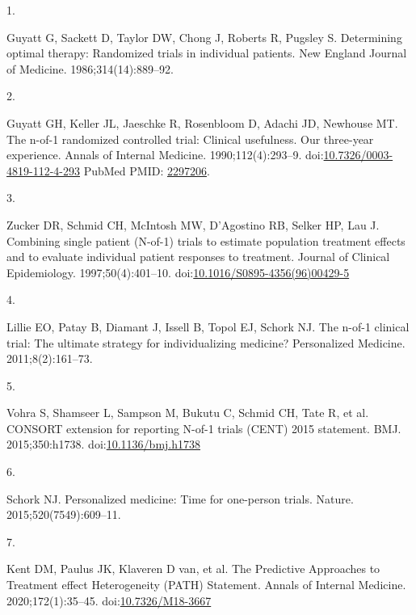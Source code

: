 \documentclass[
  11pt,
]{article}
\newlength{\cslhangindent}
\newlength{\csllabelwidth}
\newenvironment{CSLReferences}[2] %
 {\begin{list}{}{%
  \setlength{\itemindent}{0pt}
  \setlength{\leftmargin}{0pt}
  \setlength{\parsep}{0pt}
  \ifodd #1
   \setlength{\leftmargin}{\cslhangindent}
   \setlength{\itemindent}{-1\cslhangindent}
  \fi
  \setlength{\itemsep}{#2\baselineskip}}}
 {\end{list}}
\newcommand{\CSLLeftMargin}[1]{\parbox[t]{\csllabelwidth}{\strut#1\strut}}
\newcommand{\CSLRightInline}[1]{\parbox[t]{\linewidth - \csllabelwidth}{\strut#1\strut}}
\begin{document}
\protect{}\label{refs}
\begin{CSLReferences}{0}{1}
\CSLLeftMargin{1. }%
\CSLRightInline{Guyatt G, Sackett D, Taylor DW, Chong J, Roberts R, Pugsley S. Determining optimal therapy: Randomized trials in individual patients. New England Journal of Medicine. 1986;314(14):889--92.}

\CSLLeftMargin{2. }%
\CSLRightInline{Guyatt GH, Keller JL, Jaeschke R, Rosenbloom D, Adachi JD, Newhouse MT. The n-of-1 randomized controlled trial: Clinical usefulness. {O}ur three-year experience. Annals of Internal Medicine. 1990;112(4):293--9. doi:\href{https://doi.org/10.7326/0003-4819-112-4-293}{10.7326/0003-4819-112-4-293} PubMed PMID: \href{https://www.ncbi.nlm.nih.gov/pubmed/2297206}{2297206}.}

\CSLLeftMargin{3. }%
\CSLRightInline{Zucker DR, Schmid CH, McIntosh MW, D'Agostino RB, Selker HP, Lau J. Combining single patient ({N}-of-1) trials to estimate population treatment effects and to evaluate individual patient responses to treatment. Journal of Clinical Epidemiology. 1997;50(4):401--10. doi:\href{https://doi.org/10.1016/S0895-4356(96)00429-5}{10.1016/S0895-4356(96)00429-5}}

\CSLLeftMargin{4. }%
\CSLRightInline{Lillie EO, Patay B, Diamant J, Issell B, Topol EJ, Schork NJ. The n-of-1 clinical trial: The ultimate strategy for individualizing medicine? Personalized Medicine. 2011;8(2):161--73.}

\CSLLeftMargin{5. }%
\CSLRightInline{Vohra S, Shamseer L, Sampson M, Bukutu C, Schmid CH, Tate R, et al. {CONSORT} extension for reporting {N}-of-1 trials ({CENT}) 2015 statement. BMJ. 2015;350:h1738. doi:\href{https://doi.org/10.1136/bmj.h1738}{10.1136/bmj.h1738}}

\CSLLeftMargin{6. }%
\CSLRightInline{Schork NJ. Personalized medicine: Time for one-person trials. Nature. 2015;520(7549):609--11.}

\CSLLeftMargin{7. }%
\CSLRightInline{{Kent DM, Paulus JK, Klaveren D van, et al.} The {P}redictive {A}pproaches to {T}reatment effect {H}eterogeneity ({PATH}) {S}tatement. Annals of Internal Medicine. 2020;172(1):35--45. doi:\href{https://doi.org/10.7326/M18-3667}{10.7326/M18-3667}}


\end{CSLReferences}
\end{document}
